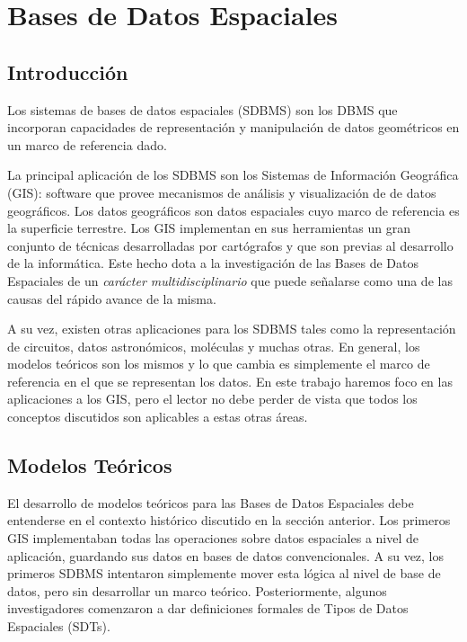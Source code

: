 \chapter{Bases de Datos Espaciales}  \label{cap:e}

\section{Introducción}


Los sistemas de bases de datos espaciales (SDBMS) son los DBMS que incorporan capacidades de representación y manipulación de
datos geométricos en un marco de referencia dado.

La principal aplicación de los SDBMS son los Sistemas de Información Geográfica (GIS): software que provee mecanismos de análisis
y visualización de de datos geográficos. Los datos geográficos son datos espaciales cuyo marco de referencia  es la superficie terrestre.
Los GIS implementan en sus herramientas un gran conjunto de técnicas desarrolladas por cartógrafos y que son previas al desarrollo de la informática.
Este hecho dota a la investigación de las Bases de Datos Espaciales de un \emph{carácter multidisciplinario} que puede señalarse como
una de las causas del rápido avance de la misma.

A su vez, existen otras aplicaciones para los SDBMS tales como la representación de circuitos, datos astronómicos, moléculas y muchas otras.
En general, los modelos teóricos son los mismos y lo que cambia es simplemente el marco de referencia en el que se representan los datos.
En este trabajo haremos foco en las aplicaciones a los GIS, pero el lector no debe perder de vista que todos los conceptos discutidos
son aplicables a estas otras áreas.

\section{Modelos Teóricos}

El desarrollo de modelos teóricos para las Bases de Datos Espaciales debe entenderse en el contexto histórico discutido en la sección anterior.
Los primeros GIS implementaban todas las operaciones sobre datos espaciales a nivel de aplicación,
guardando sus datos en bases de datos convencionales.
A su vez, los primeros SDBMS intentaron simplemente mover esta lógica al nivel de base de datos, pero sin desarrollar un marco teórico.
Posteriormente, algunos investigadores comenzaron a dar definiciones formales de Tipos de Datos Espaciales (SDTs).

